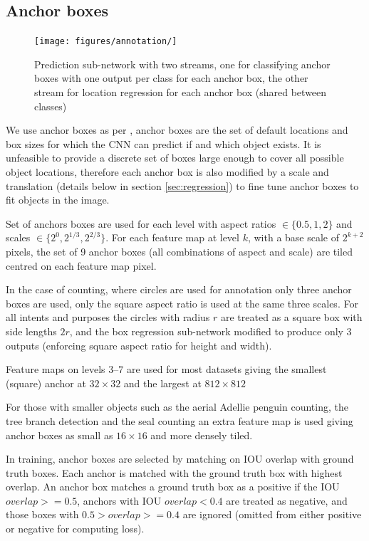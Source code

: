 \subsection{Anchor boxes}

\begin{figure}
  \centering
  \texttt{[image: figures/annotation/]}
  \caption{Prediction sub-network with two streams, one for classifying anchor boxes with one output per class for each anchor box, the other stream for location regression for each anchor box (shared between classes)}    
  \label{fig:prediction_subnet}  
\end{figure}


We use anchor boxes as per \cite{Wang2017}, anchor boxes are the set of default locations and box sizes for which the \gls{CNN} can predict if and which object exists. It is unfeasible to provide a discrete set of boxes large enough to cover all possible object locations, therefore each anchor box is also modified by a scale and translation (details below in section \ref{sec:regression}) to fine tune anchor boxes to fit objects in the image.

Set of anchors boxes are used for each level with aspect ratios $ \in \{0.5, 1, 2\} $ and scales $ \in \{2^0, 2^{1/3}, 2^{2/3}\} $. For each feature map at level $k$, with a base scale of $ 2^{k + 2} $ pixels, the set of 9 anchor boxes (all combinations of aspect and scale) are tiled centred on each feature map pixel. 

In the case of counting, where circles are used for annotation only three anchor boxes are used, only the square aspect ratio is used at the same three scales. For all intents and purposes the circles with radius $r$ are treated as a square box with side lengths $2r$, and the box regression sub-network modified to produce only $3$ outputs (enforcing square aspect ratio for height and width).

Feature maps on levels $3$--$7$ are used for most datasets giving the smallest (square) anchor at $32\times32$ and the largest at $812\times812$ 

For those with smaller objects such as the aerial Adellie penguin counting, the tree branch detection and the seal counting an extra feature map is used giving anchor boxes as small as $16\times16$ and more densely tiled.

In training, anchor boxes are selected by matching on \gls{IOU} overlap with ground truth boxes. Each anchor is matched with the ground truth box with highest overlap. An anchor box matches a ground truth box as a positive if the IOU $ overlap >= 0.5 $, anchors with IOU $ overlap < 0.4 $ are treated as negative, and those boxes with $ 0.5 > overlap >= 0.4 $ are ignored (omitted from either positive or negative for computing loss).

